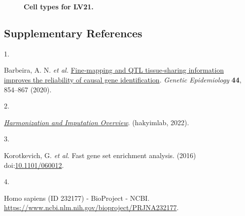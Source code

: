 \documentclass[
  a4paper,
]{article}
\newlength{\cslhangindent}
\newlength{\csllabelwidth}
\newlength{\cslentryspacingunit} %
\newenvironment{CSLReferences}[2] %
 {%
  \setlength{\parindent}{0pt}
  \ifodd #1
  \let\oldpar\par
  \def\par{\hangindent=\cslhangindent\oldpar}
  \fi
  \setlength{\parskip}{#2\cslentryspacingunit}
 }%
 {}
\newcommand{\CSLLeftMargin}[1]{\parbox[t]{\csllabelwidth}{#1}}
\newcommand{\CSLRightInline}[1]{\parbox[t]{\linewidth - \csllabelwidth}{#1}\break}
\newenvironment{fignos:tagged-figure}[1][]{
  \let\oldfigurename\figurename
  \renewcommand{\figurename}{Supplementary Figure}
}{
  \let\figurename\oldfigurename
}
\begin{document}
\begin{fignos:tagged-figure}[S24]

\begin{figure}
\hypertarget{fig:sup:lv21}{%
\centering

\caption{\textbf{Cell types for LV21.}
}\label{fig:sup:lv21}
}
\end{figure}

\end{fignos:tagged-figure}

\clearpage

\hypertarget{supplementary_references}{%
\subsection{Supplementary References}\label{supplementary_references}}

\hypertarget{refs}{}
\begin{CSLReferences}{0}{0}
\leavevmode{}%
\CSLLeftMargin{1. }%
\CSLRightInline{Barbeira, A. N. \emph{et al.} \href{https://doi.org/10.1002/gepi.22346}{Fine‐mapping and QTL tissue‐sharing information improves the reliability of causal gene identification}. \emph{Genetic Epidemiology} \textbf{44}, 854--867 (2020).}

\leavevmode{}%
\CSLLeftMargin{2. }%
\CSLRightInline{\emph{\href{https://github.com/hakyimlab/summary-gwas-imputation}{Harmonization and Imputation Overview}}. (hakyimlab, 2022).}

\leavevmode{}%
\CSLLeftMargin{3. }%
\CSLRightInline{Korotkevich, G. \emph{et al.} Fast gene set enrichment analysis. (2016) doi:\href{https://doi.org/10.1101/060012}{10.1101/060012}.}

\leavevmode{}%
\CSLLeftMargin{4. }%
\CSLRightInline{Homo sapiens (ID 232177) - BioProject - NCBI. \url{https://www.ncbi.nlm.nih.gov/bioproject/PRJNA232177}.}

\end{CSLReferences}
\end{document}
